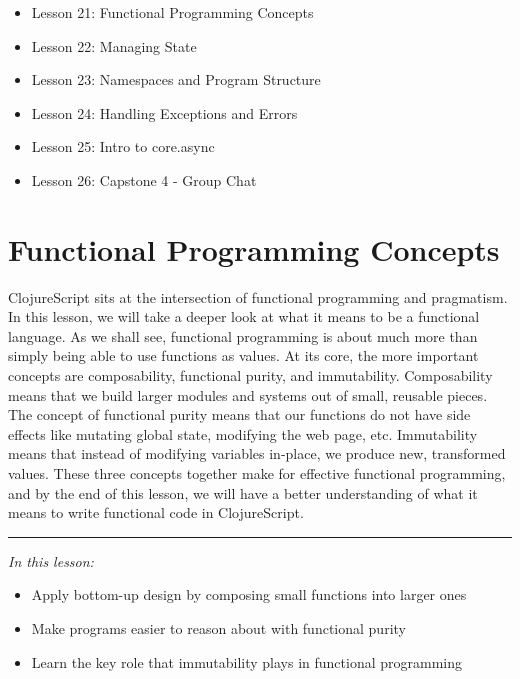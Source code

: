 \documentclass[10pt,twoside,openright]{memoir}
\begin{document}
\begin{itemize}
  \tightlist
  \item Lesson 21: Functional Programming Concepts
  \item Lesson 22: Managing State
  \item Lesson 23: Namespaces and Program Structure
  \item Lesson 24: Handling Exceptions and Errors
  \item Lesson 25: Intro to core.async
  \item Lesson 26: Capstone 4 - Group Chat
  \end{itemize}


\chapter{Functional Programming Concepts}

ClojureScript sits at the intersection of functional programming and
pragmatism. In this lesson, we will take a deeper look at what it means
to be a functional language. As we shall see, functional programming is
about much more than simply being able to use functions as values. At
its core, the more important concepts are composability, functional
purity, and immutability. Composability means that we build larger
modules and systems out of small, reusable pieces. The concept of
functional purity means that our functions do not have side effects like
mutating global state, modifying the web page, etc. Immutability means
that instead of modifying variables in-place, we produce new,
transformed values. These three concepts together make for effective
functional programming, and by the end of this lesson, we will have a
better understanding of what it means to write functional code in
ClojureScript.

\begin{center}\rule{0.5\linewidth}{0.5pt}\end{center}

\emph{In this lesson:}

\begin{itemize}
\tightlist
\item
  Apply bottom-up design by composing small functions into larger ones
\item
  Make programs easier to reason about with functional purity
\item
  Learn the key role that immutability plays in functional programming
\end{itemize}
\end{document}
